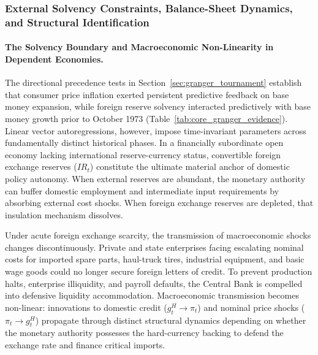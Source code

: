 
\subsubsection{External Solvency Constraints, Balance-Sheet Dynamics, and Structural Identification}
\label{sec:tvar_specification}

\paragraph{The Solvency Boundary and Macroeconomic Non-Linearity in Dependent Economies.}
The directional precedence tests in Section~\ref{sec:granger_tournament} establish that consumer price inflation exerted persistent predictive feedback on base money expansion, while foreign reserve solvency interacted predictively with base money growth prior to October 1973 (Table~\ref{tab:core_granger_evidence}). Linear vector autoregressions, however, impose time-invariant parameters across fundamentally distinct historical phases. In a financially subordinate open economy lacking international reserve-currency status, convertible foreign exchange reserves ($IR_t$) constitute the ultimate material anchor of domestic policy autonomy. When external reserves are abundant, the monetary authority can buffer domestic employment and intermediate input requirements by absorbing external cost shocks. When foreign exchange reserves are depleted, that insulation mechanism dissolves. 

Under acute foreign exchange scarcity, the transmission of macroeconomic shocks changes discontinuously. Private and state enterprises facing escalating nominal costs for imported spare parts, haul-truck tires, industrial equipment, and basic wage goods could no longer secure foreign letters of credit. To prevent production halts, enterprise illiquidity, and payroll defaults, the Central Bank is compelled into defensive liquidity accommodation. Macroeconomic transmission becomes non-linear: innovations to domestic credit ($g^H_t \to \pi_t$) and nominal price shocks ($\pi_t \to g^H_t$) propagate through distinct structural dynamics depending on whether the monetary authority possesses the hard-currency backing to defend the exchange rate and finance critical imports.

